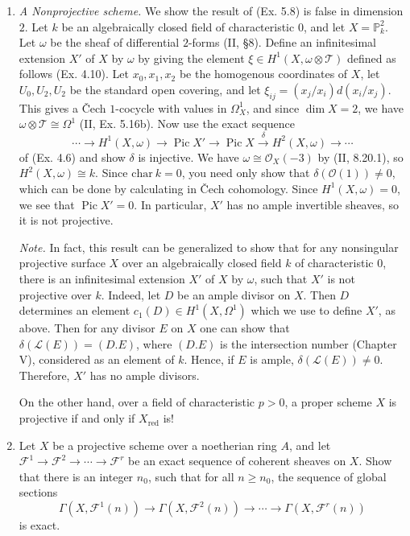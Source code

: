 \documentclass{article}
\newcommand{\fF}{\mathscr{F}}
\newcommand{\fO}{\mathscr{O}}
\newcommand{\fL}{\mathscr{L}}
\newcommand{\PP}{\mathbb{P}}
\DeclareMathOperator{\pic}{Pic}
\begin{document}
\begin{enumerate} [label=\textbf{\arabic*.}, leftmargin=0em]
\item \textit{A Nonprojective scheme.} We show the result of (Ex. 5.8) is false in dimension $2$. Let $k$ be an algebraically closed field of characteristic $0$, and let $X = \PP_k^2$. Let $\omega$ be the sheaf of differential $2$-forms (II, \S 8). Define an infinitesimal extension $X'$ of $X$ by $\omega$ by giving the element $\xi \in H^1(X, \omega \otimes \mathscr{T})$ defined as follows (Ex. 4.10). Let $x_0, x_1, x_2$ be the homogenous coordinates of $X$, let $U_0, U_2, U_2$ be the standard open covering, and let $\xi_{ij} = (x_j / x_i) d(x_i / x_j)$. This gives a Čech $1$-cocycle with values in $\Omega_X^1$, and since $\dim{X} = 2$, we have $\omega \otimes \mathscr{T} \cong \Omega^1$ (II, Ex. 5.16b). Now use the exact sequence
\begin{equation*}
  \cdots \to H^1(X, \omega) \to \pic{X'} \to \pic{X} \xrightarrow{\delta} H^2(X, \omega) \to \cdots
\end{equation*}
of (Ex. 4.6) and show $\delta$ is injective. We have $\omega \cong \fO_X(-3)$ by (II, 8.20.1), so $H^2(X, \omega) \cong k$. Since $\text{char}~k = 0$, you need only show that $\delta(\fO(1)) \neq 0$, which can be done by calculating in Čech cohomology. Since $H^1(X, \omega) = 0$, we see that $\pic{X'} = 0$. In particular, $X'$ has no ample invertible sheaves, so it is not projective.

\textit{Note.} In fact, this result can be generalized to show that for any nonsingular projective surface $X$ over an algebraically closed field $k$ of characteristic $0$, there is an infinitesimal extension $X'$ of $X$ by $\omega$, such that $X'$ is not projective over $k$. Indeed, let $D$ be an ample divisor on $X$. Then $D$ determines an element $c_1(D) \in H^1(X, \Omega^1)$ which we use to define $X'$, as above. Then for any divisor $E$ on $X$ one can show that $\delta(\fL(E)) = (D.E)$, where $(D.E)$ is the intersection number (Chapter V), considered as an element of $k$. Hence, if $E$ is ample, $\delta(\mathscr{L}(E)) \neq 0$. Therefore, $X'$ has no ample divisors.

On the other hand, over a field of characteristic $p > 0$, a proper scheme $X$ is projective if and only if $X_\text{red}$ is!

\item Let $X$ be a projective scheme over a noetherian ring $A$, and let $\fF^1 \to \fF^2 \to \cdots \to \fF^r$ be an exact sequence of coherent sheaves on $X$. Show that there is an integer $n_0$, such that for all $n \geq n_0$, the sequence of global sections
\begin{equation*}
  \Gamma(X, \fF^1(n)) \to \Gamma(X, \fF^2(n)) \to \cdots \to \Gamma(X, \fF^r(n))
\end{equation*}
is exact.

\end{enumerate}
\end{document}
